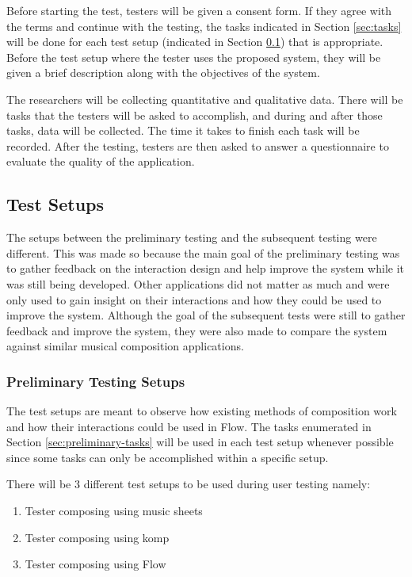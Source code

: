 Before starting the test, testers will be given a consent form. If they agree with the terms and continue with the testing, the tasks indicated in Section \ref{sec:tasks} will be done for each test setup (indicated in Section \ref{sec:test-setups}) that is appropriate. Before the test setup where the tester uses the proposed system, they will be given a brief description along with the objectives of the system. 

The researchers will be collecting quantitative and qualitative data. There will be tasks that the testers will be asked to accomplish, and during and after those tasks, data will be collected. The time it takes to finish each task will be recorded. After the testing, testers are then asked to answer a questionnaire to evaluate the quality of the application.

\subsection{Test Setups}
\label{sec:test-setups}

The setups between the preliminary testing and the subsequent testing were different. This was made so because the main goal of the preliminary testing was to gather feedback on the interaction design and help improve the system while it was still being developed. Other applications did not matter as much and were only used to gain insight on their interactions and how they could be used to improve the system. Although the goal of the subsequent tests were still to gather feedback and improve the system, they were also made to compare the system against similar musical composition applications. 

\subsubsection{Preliminary Testing Setups}

The test setups are meant to observe how existing methods of composition work and how their interactions could be used in Flow. The tasks enumerated in Section \ref{sec:preliminary-tasks} will be used in each test setup whenever possible since some tasks can only be accomplished within a specific setup. 

There will be 3 different test setups to be used during user testing namely:

\begin{enumerate}
\item Tester composing using music sheets
\item Tester composing using komp
\item Tester composing using Flow
\end{enumerate}

